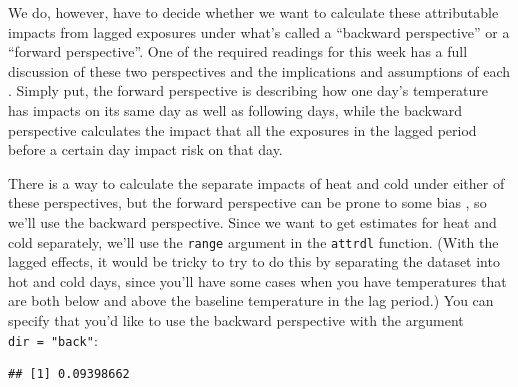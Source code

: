 \documentclass[
]{book}
\newenvironment{Shaded}{\begin{snugshade}}{\end{snugshade}}
\newcommand{\CommentTok}[1]{\textcolor[rgb]{0.56,0.35,0.01}{\textit{#1}}}
\newcommand{\DataTypeTok}[1]{\textcolor[rgb]{0.13,0.29,0.53}{#1}}
\newcommand{\DecValTok}[1]{\textcolor[rgb]{0.00,0.00,0.81}{#1}}
\newcommand{\KeywordTok}[1]{\textcolor[rgb]{0.13,0.29,0.53}{\textbf{#1}}}
\newcommand{\NormalTok}[1]{#1}
\newcommand{\OperatorTok}[1]{\textcolor[rgb]{0.81,0.36,0.00}{\textbf{#1}}}
\newcommand{\StringTok}[1]{\textcolor[rgb]{0.31,0.60,0.02}{#1}}
\begin{document}
We do, however, have to decide whether we want to calculate these attributable impacts from lagged exposures under what's called a ``backward perspective'' or a ``forward perspective''. One of the required readings for this week has a full discussion of these two perspectives and the implications and assumptions of each \citep{gasparrini2014attributable}. Simply put, the forward perspective is describing how one day's temperature has impacts on its same day as well as following days, while the backward perspective calculates the impact that all the exposures in the lagged period before a certain day impact risk on that day.

There is a way to calculate the separate impacts of heat and cold under either of these perspectives, but the forward perspective can be prone to some bias \citep{gasparrini2014attributable}, so we'll use the backward perspective. Since we want to get estimates for heat and cold separately, we'll use the \texttt{range} argument in the \texttt{attrdl} function. (With the lagged effects, it would be tricky to try to do this by separating the dataset into hot and cold days, since you'll have some cases when you have temperatures that are both below and above the baseline temperature in the lag period.) You can specify that you'd like to use the backward perspective with the argument \texttt{dir\ =\ "back"}:

\begin{Shaded}
\end{Shaded}

\begin{verbatim}
## [1] 0.09398662
\end{verbatim}
\end{document}
